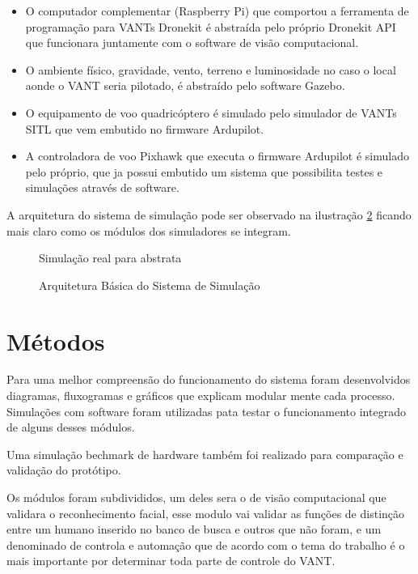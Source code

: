 \begin{itemize}
	\item O computador complementar (Raspberry Pi) que comportou a ferramenta de programação para VANTs Dronekit é abstraída pelo próprio Dronekit API que funcionara juntamente com o software de visão computacional.
	\item O ambiente físico, gravidade, vento, terreno e luminosidade no caso o local aonde o VANT seria pilotado, é abstraído pelo software Gazebo. 
	\item O equipamento de voo quadricóptero é simulado pelo simulador de VANTs SITL que vem embutido no firmware Ardupilot.
	\item A controladora de voo Pixhawk que executa o firmware Ardupilot é simulado pelo próprio, que ja possui embutido um sistema que possibilita testes e simulações através de software.  
\end{itemize} 

A arquitetura do sistema de simulação pode ser observado na ilustração \ref{fig:arc} ficando mais claro como os módulos dos simuladores se integram. 

\begin{figure}[H]
	\centering
	\caption{Simulação real para abstrata}
	\fontsize{9pt}{12pt}\selectfont
	\def\svgwidth{15cm}
	
	\label{fig:simul}
\end{figure}

\begin{figure}[H]
	\centering
	\caption{Arquitetura Básica do Sistema de Simulação}
	\fontsize{9pt}{12pt}\selectfont
	\def\svgwidth{15cm}
	
	\label{fig:arc}
\end{figure}

\section{Métodos}

Para uma melhor compreensão do funcionamento do sistema foram desenvolvidos diagramas, fluxogramas e gráficos que explicam modular mente cada processo. Simulações com software foram utilizadas pata testar o funcionamento integrado de alguns desses módulos. 

Uma simulação bechmark de hardware também foi realizado para comparação e validação do protótipo.

Os módulos foram subdivididos, um deles sera o de visão computacional que validara o reconhecimento facial, esse modulo vai validar as funções de distinção entre um humano inserido no banco de busca e outros que não foram, e um denominado de controla e automação que de acordo com o tema do trabalho é o mais importante por determinar toda parte de controle do VANT.

